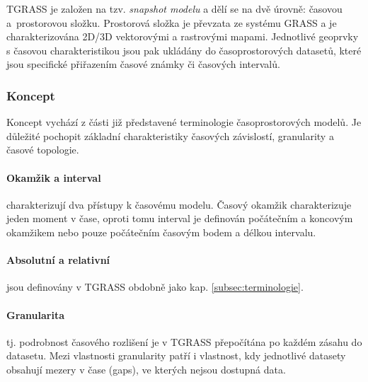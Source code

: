 \documentclass[a4paper,12pt,oneside]{report}
\begin{document}
TGRASS je založen na tzv. {\em snapshot modelu} a dělí se na dvě úrovně:
časovou a~prostorovou složku. Prostorová složka je převzata ze systému GRASS a je
charakterizována 2D/3D vektorovými a rastrovými mapami. Jednotlivé
geoprvky s časovou charakteristikou jsou pak ukládány do časoprostorových
datasetů, které jsou specifické přiřazením časové známky či časových
intervalů.

\subsubsection{Koncept} 
Koncept vychází z části již představené terminologie časoprostorových
modelů. Je důležité pochopit základní charakteristiky časových závislostí,
granularity a časové topologie.

\paragraph*{Okamžik a interval} charakterizují dva přístupy k časovému
modelu.  Časový okamžik charakterizuje jeden moment v čase, oproti
tomu interval je definován počátečním  a koncovým okamžikem nebo pouze
počátečním časovým bodem a délkou intervalu.

\paragraph*{Absolutní a relativní} jsou definovány v TGRASS obdobně
jako kap. \ref{subsec:terminologie}.

\paragraph*{Granularita} tj. podrobnost časového rozlišení je v TGRASS
přepočítána po každém zásahu do datasetu. Mezi vlastnosti granularity
patří i vlastnost, kdy jednotlivé datasety obsahují mezery v čase
(gaps), ve kterých nejsou dostupná data.
\end{document}
